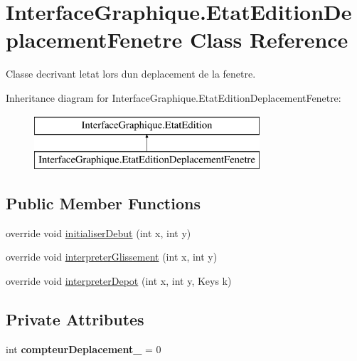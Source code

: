 \hypertarget{class_interface_graphique_1_1_etat_edition_deplacement_fenetre}{}\section{Interface\+Graphique.\+Etat\+Edition\+Deplacement\+Fenetre Class Reference}
\label{class_interface_graphique_1_1_etat_edition_deplacement_fenetre}


Classe decrivant l\textquotesingle{}etat lors d\textquotesingle{}un deplacement de la fenetre.  


Inheritance diagram for Interface\+Graphique.\+Etat\+Edition\+Deplacement\+Fenetre\+:\begin{figure}[H]
\begin{center}
\leavevmode
\includegraphics[height=2.000000cm]{class_interface_graphique_1_1_etat_edition_deplacement_fenetre}
\end{center}
\end{figure}
\subsection*{Public Member Functions}
\begin{DoxyCompactItemize}
\item 
override void \hyperlink{group__inf2990_ga3b56f73ff6944303866bc08d6f00d8d8}{initialiser\+Debut} (int x, int y)
\item 
override void \hyperlink{group__inf2990_gad13e7a9269ef5b704cd6732b08645c7e}{interpreter\+Glissement} (int x, int y)
\item 
override void \hyperlink{group__inf2990_ga45efdcabfec34cf74a82f4825aed8f7d}{interpreter\+Depot} (int x, int y, Keys k)
\end{DoxyCompactItemize}
\subsection*{Private Attributes}
\begin{DoxyCompactItemize}
\item 
int {\bfseries compteur\+Deplacement\+\_\+} = 0
\end{DoxyCompactItemize}
